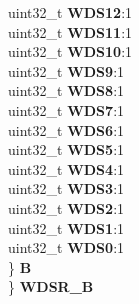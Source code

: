 \begin{DoxyCompactItemize}
\begin{tabbing}
\>\>uint32\_t {\bfseries WDS12}:1\\
\>\>uint32\_t {\bfseries WDS11}:1\\
\>\>uint32\_t {\bfseries WDS10}:1\\
\>\>uint32\_t {\bfseries WDS9}:1\\
\>\>uint32\_t {\bfseries WDS8}:1\\
\>\>uint32\_t {\bfseries WDS7}:1\\
\>\>uint32\_t {\bfseries WDS6}:1\\
\>\>uint32\_t {\bfseries WDS5}:1\\
\>\>uint32\_t {\bfseries WDS4}:1\\
\>\>uint32\_t {\bfseries WDS3}:1\\
\>\>uint32\_t {\bfseries WDS2}:1\\
\>\>uint32\_t {\bfseries WDS1}:1\\
\>\>uint32\_t {\bfseries WDS0}:1\\
\>\} {\bfseries B}\\
\} {\bfseries WDSR\_B}\\


\end{tabbing}
\end{DoxyCompactItemize}
